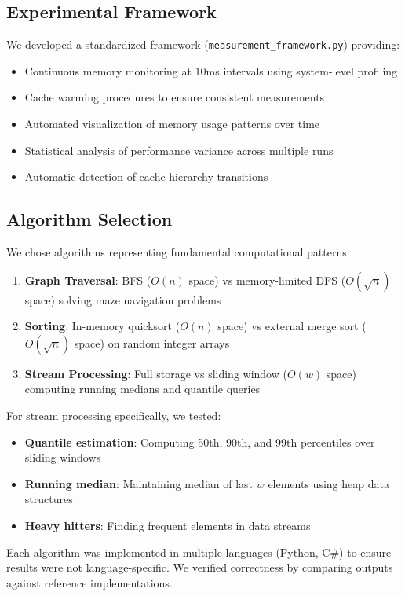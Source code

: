 \documentclass[11pt]{article}
\theoremstyle{definition}
\begin{document}
\subsection{Experimental Framework}

We developed a standardized framework (\texttt{measurement\_framework.py}) providing:
\begin{itemize}
\item Continuous memory monitoring at 10ms intervals using system-level profiling
\item Cache warming procedures to ensure consistent measurements  
\item Automated visualization of memory usage patterns over time
\item Statistical analysis of performance variance across multiple runs
\item Automatic detection of cache hierarchy transitions
\end{itemize}

\subsection{Algorithm Selection}

We chose algorithms representing fundamental computational patterns:
\begin{enumerate}
\item \textbf{Graph Traversal}: BFS ($O(n)$ space) vs memory-limited DFS ($O(\sqrt{n})$ space) solving maze navigation problems
\item \textbf{Sorting}: In-memory quicksort ($O(n)$ space) vs external merge sort ($O(\sqrt{n})$ space) on random integer arrays
\item \textbf{Stream Processing}: Full storage vs sliding window ($O(w)$ space) computing running medians and quantile queries
\end{enumerate}

For stream processing specifically, we tested:
\begin{itemize}
\item \textbf{Quantile estimation}: Computing 50th, 90th, and 99th percentiles over sliding windows
\item \textbf{Running median}: Maintaining median of last $w$ elements using heap data structures
\item \textbf{Heavy hitters}: Finding frequent elements in data streams
\end{itemize}

Each algorithm was implemented in multiple languages (Python, C\#) to ensure results were not language-specific. We verified correctness by comparing outputs against reference implementations.
\end{document}
